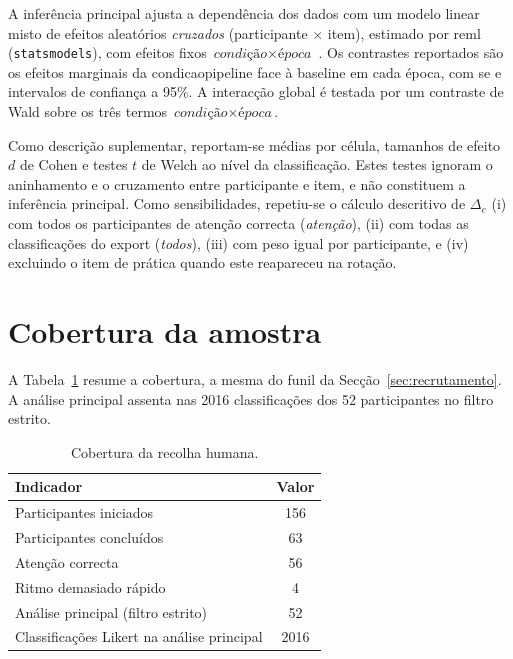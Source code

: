A inferência principal ajusta a dependência dos dados com um modelo linear misto de efeitos aleatórios \textit{cruzados} (participante \(\times\) item), estimado por \gls{reml} (\texttt{statsmodels}), com efeitos fixos \(\textit{condição} \times \textit{época}\) \parencite{Baayen2008Mixed}. Os contrastes reportados são os efeitos marginais da \gls{condicaopipeline} face à \gls{baseline} em cada época, com \gls{se} e intervalos de confiança a 95\%. A interacção global é testada por um contraste de Wald sobre os três termos \(\textit{condição}\times\textit{época}\).

Como descrição suplementar, reportam-se médias por célula, tamanhos de efeito \(d\) de Cohen e testes \(t\) de Welch ao nível da classificação. Estes testes ignoram o aninhamento e o cruzamento entre participante e item, e não constituem a inferência principal. Como sensibilidades, repetiu-se o cálculo descritivo de \(\Delta_e\) (i) com todos os participantes de atenção correcta (\textit{atenção}), (ii) com todas as classificações do export (\textit{todos}), (iii) com peso igual por participante, e (iv) excluindo o item de prática quando este reapareceu na rotação.


\section{Cobertura da amostra}
\label{sec:res_amostra}

A Tabela~\ref{tab:amostra_recolha} resume a cobertura, a mesma do funil da Secção~\ref{sec:recrutamento}. A análise principal assenta nas 2016 classificações dos 52 participantes no filtro estrito.

\begin{table}[ht]
\centering
\caption{Cobertura da recolha humana.}
\label{tab:amostra_recolha}
\begin{tabular}{lc}
\hline
Indicador & Valor \\
\hline
Participantes iniciados & 156 \\
Participantes concluídos & 63 \\
Atenção correcta & 56 \\
Ritmo demasiado rápido & 4 \\
Análise principal (filtro estrito) & 52 \\
Classificações Likert na análise principal & 2016 \\
\hline
\end{tabular}
\end{table}

